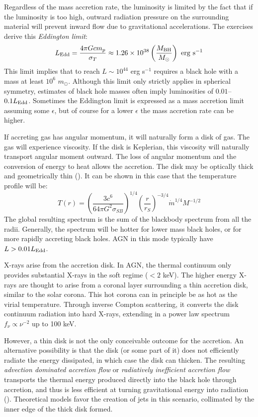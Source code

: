 Regardless of the mass accretion rate, the luminosity is limited by
the fact that if the luminosity is too high, outward radiation
pressure on the surrounding material will prevent inward flow due to
gravitational accelerations. The exercises derive this {\it Eddington
  limit}:
\begin{equation}
L_{\rm Edd} = \frac{4\pi G c m_p}{\sigma_T} \approx 1.26 \times
10^{38} \left(\frac{M_{\rm BH}}{M_\odot}\right) \mathrm{~erg~s}^{-1}
\end{equation}
This limit implies that to reach $L\sim 10^{44}$ erg s$^{-1}$ requires
a black hole with a mass at least $10^6$ $m_\odot$. Although this
limit only strictly applies in spherical symmetry, estimates of black
hole masses often imply luminosities of $0.01$--$0.1 L_{\rm
Edd}$. Sometimes the Eddington limit is expressed as a mass accretion
limit assuming some $\epsilon$, but of course for a lower $\epsilon$
the mass accretion rate can be higher.

If accreting gas has angular momentum, it will naturally form a disk
of gas. The gas will experience viscosity. If the disk is Keplerian,
this viscosity will naturally transport angular moment outward. The
loss of angular momentum and the conversion of energy to heat allows
the accretion. The disk may be optically thick and geometrically thin
(\citealt{shakura73a}). It can be shown in this case that the
temperature profile will be:
\begin{equation}
  T(r) = \left(\frac{3 c^6}{64\pi G^2 \sigma_{SB}}\right)^{1/4}
    \left(\frac{r}{r_S}\right)^{-3/4} {\dot m}^{1/4} M^{-1/2}
\end{equation}
The global resulting spectrum is the sum of the blackbody spectrum
from all the radii. Generally, the spectrum will be hotter for lower
mass black holes, or for more rapidly accreting black holes. AGN in
this mode typically have $L>0.01 L_{\rm Edd}$.

X-rays arise from the accretion disk. In AGN, the thermal continuum
only provides substantial X-rays in the soft regime ($<2$ keV). The
higher energy X-rays are thought to arise from a coronal layer
surrounding a thin accretion disk, similar to the solar corona. This
hot corona can in principle be as hot as the virial
temperature. Through inverse Compton scattering, it converts the disk
continuum radiation into hard X-rays, extending in a power law
spectrum $f_\nu \propto \nu^{-2}$ up to 100 keV.

However, a thin disk is not the only conceivable outcome for the
accretion. An alternative possibility is that the disk (or some part
of it) does not efficiently radiate the energy dissipated, in which
case the disk can thicken. The resulting {\it advection dominated
accretion flow} or {\it radiatively inefficient accretion flow}
transports the thermal energy produced directly into the black hole
through accretion, and thus is less efficient at turning gravitational
energy into radiation (\citealt{narayan05a}). Theoretical models favor
the creation of jets in this scenario, collimated by the inner edge of
the thick disk formed.

